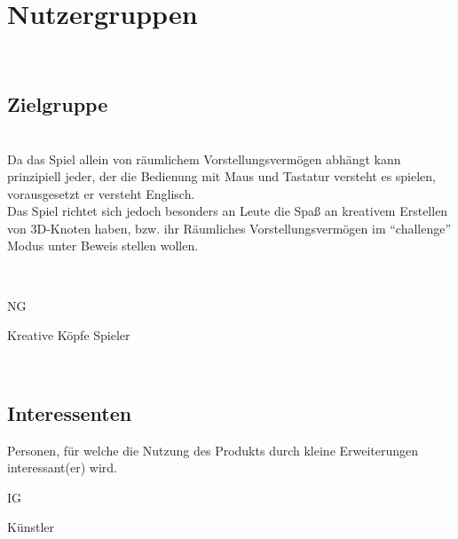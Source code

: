 %
%


\chapter{Nutzergruppen}
\label{NG}~\\


\section{Zielgruppe}
\label{NG:ZG}

~\\
Da das Spiel allein von räumlichem Vorstellungsvermögen abhängt kann prinzipiell jeder, der die Bedienung mit Maus und Tastatur versteht es spielen, vorausgesetzt er versteht Englisch.
\\
Das Spiel richtet sich jedoch besonders an Leute die Spaß an kreativem Erstellen von 3D-Knoten haben, bzw. ihr Räumliches Vorstellungsvermögen im "`challenge"' Modus unter Beweis stellen wollen.

~\\

\begin{ids}{\gls{NG}}

	\id[10] Kreative Köpfe
	\id[20] Spieler

\end{ids}
~\\



\section{Interessenten}
\label{NG:Interessenten}

Personen, für welche die Nutzung des Produkts durch kleine Erweiterungen interessant(er) wird.\\


\begin{ids}{\gls{IG}}

	\id[30] Künstler

\end{ids}

